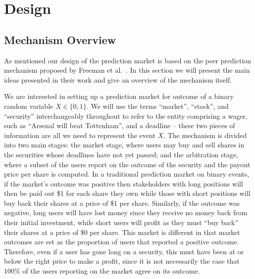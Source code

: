 \section{Design}


\label{sec:design}

\subsection{Mechanism Overview}

As mentioned our design of the prediction market is based on the peer
prediction mechanism proposed by Freeman et al.~\cite{Freeman2017}. In this
section we will present the main ideas presented in their work and give an
overview of the mechanism itself.

We are interested in setting up a prediction market for outcome of a binary
random variable $X \in \{0,1\}$. We will use the terms ``market'', ``stock'',
and ``security'' interchangeably throughout to refer to the entity comprising a
wager, such as ``Arsenal will beat Tottenham'', and a deadline -- these two
pieces of information are all we need to represent the event $X$. The mechanism
is divided into two main stages: the market stage, where users may buy and sell
shares in the securities whose deadlines have not yet passed; and the
arbitration stage, where a subset of the users report on the outcome of the
security and the payout price per share is computed. In a traditional
prediction market on binary events, if the market's outcome was positive then
stakeholders with long positions will then be paid out \$1 for each share they
own while those with short positions will buy back their shares at a price of
\$1 per share. Similarly, if the outcome was negative, long users will have
lost money since they receive no money back from their initial investment,
while short users will profit as they must ``buy back'' their shares at a price
of \$0 per share. This market is different in that market outcomes are set as
the proportion of users that reported a positive outcome. Therefore, even if a
user has gone long on a security, this must have been at or below the right
price to make a profit, since it is not necessarily the case that 100\% of the
users reporting on the market agree on its outcome.


